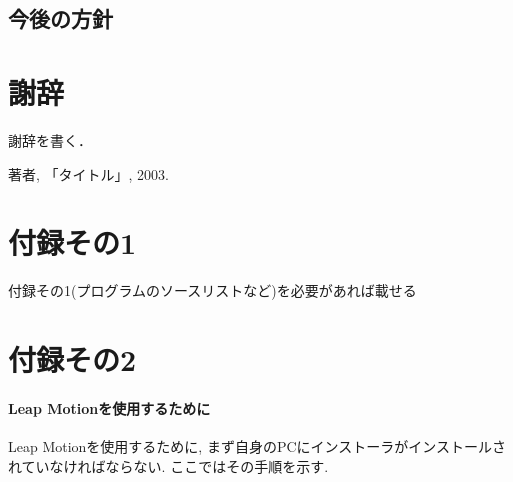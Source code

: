 \documentclass{funthesis}
\begin{document}

\section{今後の方針}



\chapter*{謝辞}

謝辞を書く．


\begin{thebibliography}{9}
  著者, 「タイトル」, 2003.
\end{thebibliography}


\appendix

\chapter*{付録その1} %

付録その1(プログラムのソースリストなど)を必要があれば載せる

\chapter*{付録その2}
\subsubsection{Leap Motionを使用するために}
Leap Motionを使用するために, まず自身のPCにインストーラがインストールされていなければならない. ここではその手順を示す.\\
\end{document}
